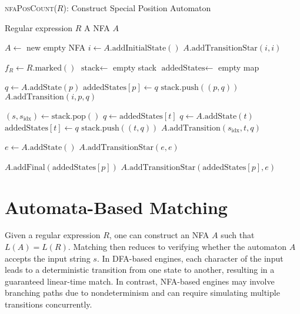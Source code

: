 \begin{algorithm}[H]
\caption{\textsc{nfaPosCount}($R$): Construct Special Position Automaton}
\label{alg:nfaPosCount}
\begin{small}
\begin{algorithmic}[1]
\Require Regular expression $R$
\Ensure A NFA $A$

\State $A \gets$ new empty NFA
\State $i \gets A.\text{addInitialState}()$
\State $A.\text{addTransitionStar}(i, i)$ 

\State $f_R \gets R.\text{marked}()$
\State $\text{stack} \gets$ empty stack
\State $\text{addedStates} \gets$ empty map

    \State $q \gets A.\text{addState}(p)$
    \State $\text{addedStates}[p] \gets q$
    \State $\text{stack}.\text{push}((p, q))$
    \State $A.\text{addTransition}(i, p, q)$
\EndFor


    \State $(s, s_{\text{idx}}) \gets \text{stack}.\text{pop}()$
            \State $q \gets \text{addedStates}[t]$
        \Else
            \State $q \gets A.\text{addState}(t)$
            \State $\text{addedStates}[t] \gets q$
            \State $\text{stack}.\text{push}((t, q))$
        \EndIf
        \State $A.\text{addTransition}(s_{\text{idx}}, t, q)$
    \EndFor
\EndWhile

\State $e \gets A.\text{addState}()$
\State $A.\text{addTransitionStar}(e, e)$

        \State $A.\text{addFinal}(\text{addedStates}[p])$
        \State $A.\text{addTransitionStar}(\text{addedStates}[p], e)$
    \EndIf
\EndFor

\end{algorithmic}
\end{small}
\end{algorithm}

\section{Automata-Based Matching}

Given a regular expression $R$, one can construct an NFA $A$ such that $L(A) = L(R)$. Matching then reduces to verifying whether the automaton $A$ accepts the input string $s$. In DFA-based engines, each character of the input leads to a deterministic transition from one state to another, resulting in a guaranteed linear-time match. In contrast, NFA-based engines may involve branching paths due to nondeterminism and can require simulating multiple transitions concurrently.

